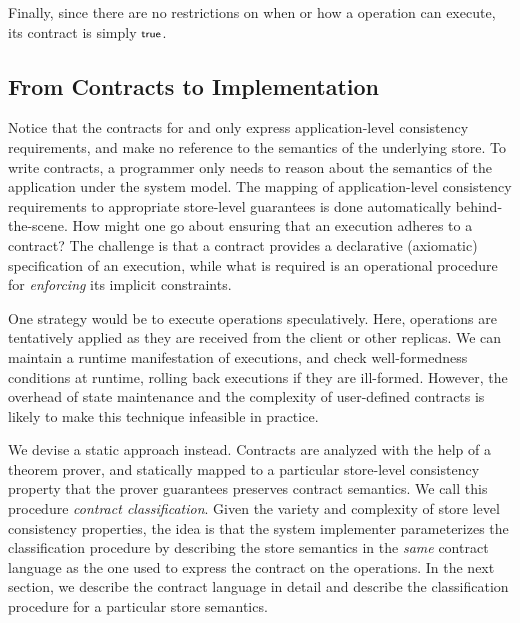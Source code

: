 Finally, since there are no restrictions on when or how a 
operation can execute, its contract is simply $\small \true$.

\subsection{From Contracts to Implementation}

Notice that the contracts for  and  only express
application-level consistency requirements, and make no reference to the
semantics of the underlying store. To write contracts, a programmer only needs
to reason about the semantics of the application under the \name system model.
The mapping of application-level consistency requirements to appropriate
store-level guarantees is done automatically behind-the-scene. How might one go
about ensuring that an execution adheres to a contract? The challenge is that a
contract provides a declarative (axiomatic) specification of an execution,
while what is required is an operational procedure for \emph{enforcing} its
implicit constraints.

One strategy would be to execute operations speculatively.  Here, operations
are tentatively applied as they are received from the client or other replicas.
We can maintain a runtime manifestation of executions, and check
well-formedness conditions at runtime, rolling back executions if they are
ill-formed. However, the overhead of state maintenance and the complexity of
user-defined contracts is likely to make this technique infeasible in practice.

We devise a static approach instead. Contracts are analyzed with the help of a
theorem prover, and statically mapped to a particular store-level consistency
property that the prover guarantees preserves contract semantics. We call this
procedure \emph{contract classification}. Given the variety and complexity of
store level consistency properties, the idea is that the system implementer
parameterizes the classification procedure by describing the store semantics in
the \emph{same} contract language as the one used to express the contract on
the operations. In the next section, we describe the contract language in
detail and describe the classification procedure for a particular store
semantics.
